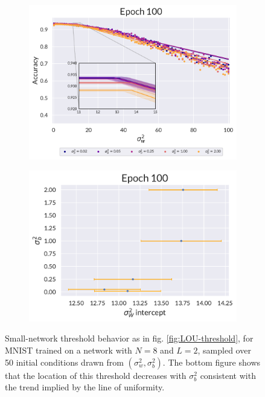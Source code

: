 \begin{figure}[H]
	\centering
	\begin{subfigure}[t]{0.5\textwidth}
		\includegraphics[width=\textwidth]{figures/chapter4/shallowNetworkSlopeL2.pdf}
	\end{subfigure}\hfill
	\begin{subfigure}[t]{0.5\textwidth}
		\includegraphics[width=\textwidth]{figures/chapter4/shallowNetworkSlopeInterceptL2.pdf}
	\end{subfigure}
	\caption{Small-network threshold behavior as in fig. \ref{fig:LOU-threshold}, for MNIST trained on a network with $N=8$ and $L=2$, sampled over 50 initial conditions drawn from $(\sigma_w^2,\sigma_b^2)$. The bottom figure shows that the location of this threshold decreases with $\sigma_b^2$ consistent with the trend implied by the line of uniformity.}
	\label{fig:LOU-threshold_L2}
\end{figure}

